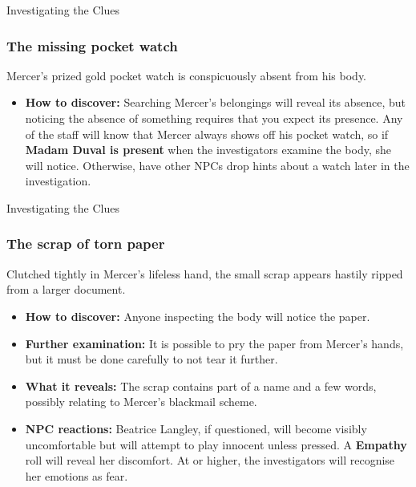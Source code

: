 \begin{CommentBox}{Investigating the Clues}
	\subsubsection*{The missing pocket watch}
	Mercer’s prized gold pocket watch is conspicuously absent from his body. 
	\begin{itemize}
		\item \textbf{How to discover:} Searching Mercer’s belongings will reveal its absence, but noticing the absence of something requires that you expect its presence. Any of the staff will know that Mercer always shows off his pocket watch, so if \textbf{Madam Duval is present} when the investigators examine the body, she will notice. Otherwise, have other NPCs drop hints about a watch later in the investigation.
	\end{itemize}
\end{CommentBox}	


\newcolumn


\begin{CommentBox}{Investigating the Clues}
	\subsubsection*{The scrap of torn paper}
	Clutched tightly in Mercer’s lifeless hand, the small scrap appears hastily ripped from a larger document.
	\begin{itemize}
		\item \textbf{How to discover:} Anyone inspecting the body will notice the paper.
		\item \textbf{Further examination:} It is possible to pry the paper from Mercer's hands, but it must be done carefully to not tear it further.
		\item \textbf{What it reveals:} The scrap contains part of a name and a few words, possibly relating to Mercer's blackmail scheme.
		\item \textbf{NPC reactions:} Beatrice Langley, if questioned, will become visibly uncomfortable but will attempt to play innocent unless pressed. A \Basic \textbf{Empathy} roll will reveal her discomfort. At \Formidable or higher, the investigators will recognise her emotions as fear.
	\end{itemize}
\end{CommentBox}	



